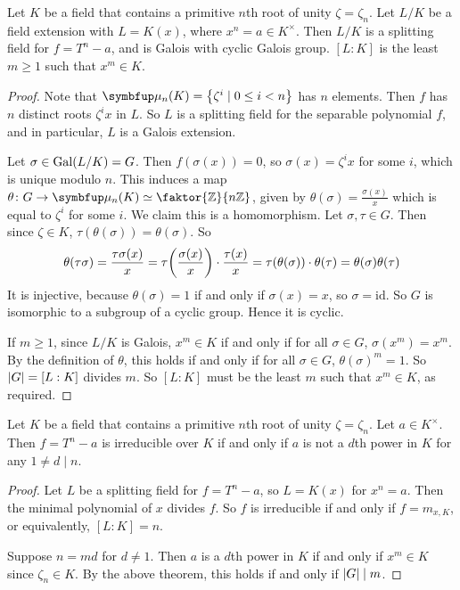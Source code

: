 \begin{theorem}
	Let \( K \) be a field that contains a primitive \( n \)th root of unity \( \zeta = \zeta_n \).
	Let \( L / K \) be a field extension with \( L = K(x) \), where \( x^n = a \in K^\times \).
	Then \( L / K \) is a splitting field for \( f = T^n - a \), and is Galois with cyclic Galois group.
	\( [L : K] \) is the least \( m \geq 1 \) such that \( x^m \in K \).
\end{theorem}
\begin{proof}
	Note that \( \bm \mu_n(K) = \qty{\zeta^i \mid 0 \leq i < n} \) has \( n \) elements.
	Then \( f \) has \( n \) distinct roots \( \zeta^i x \) in \( L \).
	So \( L \) is a splitting field for the separable polynomial \( f \), and in particular, \( L \) is a Galois extension.

	Let \( \sigma \in \operatorname{Gal}(L/K) = G \).
	Then \( f(\sigma(x)) = 0 \), so \( \sigma(x) = \zeta^i x \) for some \( i \), which is unique modulo \( n \).
	This induces a map \( \theta \colon G \to \bm \mu_n(K) \simeq \faktor{\mathbb Z}{n\mathbb Z} \), given by \( \theta(\sigma) = \frac{\sigma(x)}{x} \) which is equal to \( \zeta^i \) for some \( i \).
	We claim this is a homomorphism.
	Let \( \sigma, \tau \in G \).
	Then since \( \zeta \in K \), \( \tau(\theta(\sigma)) = \theta(\sigma) \).
	So
	\[ \theta(\tau\sigma) = \frac{\tau\sigma(x)}{x} = \tau\qty(\frac{\sigma(x)}{x}) \cdot \frac{\tau(x)}{x} = \tau(\theta(\sigma)) \cdot \theta(\tau) = \theta(\sigma) \theta(\tau) \]
	It is injective, because \( \theta(\sigma) = 1 \) if and only if \( \sigma(x) = x \), so \( \sigma = \mathrm{id} \).
	So \( G \) is isomorphic to a subgroup of a cyclic group.
	Hence it is cyclic.

	If \( m \geq 1 \), since \( L / K \) is Galois, \( x^m \in K \) if and only if for all \( \sigma \in G \), \( \sigma(x^m) = x^m \).
	By the definition of \( \theta \), this holds if and only if for all \( \sigma \in G \), \( \theta(\sigma)^m = 1 \).
	So \( \abs{G} = [L:K] \) divides \( m \).
	So \( [L:K] \) must be the least \( m \) such that \( x^m \in K \), as required.
\end{proof}
\begin{corollary}
	Let \( K \) be a field that contains a primitive \( n \)th root of unity \( \zeta = \zeta_n \).
	Let \( a \in K^\times \).
	Then \( f = T^n - a \) is irreducible over \( K \) if and only if \( a \) is not a \( d \)th power in \( K \) for any \( 1 \neq d \mid n \).
\end{corollary}
\begin{proof}
	Let \( L \) be a splitting field for \( f = T^n - a \), so \( L = K(x) \) for \( x^n = a \).
	Then the minimal polynomial of \( x \) divides \( f \).
	So \( f \) is irreducible if and only if \( f = m_{x,K} \), or equivalently, \( [L : K] = n \).

	Suppose \( n = md \) for \( d \neq 1 \).
	Then \( a \) is a \( d \)th power in \( K \) if and only if \( x^m \in K \) since \( \zeta_n \in K \).
	By the above theorem, this holds if and only if \( \abs{G} \mid m \).
\end{proof}

